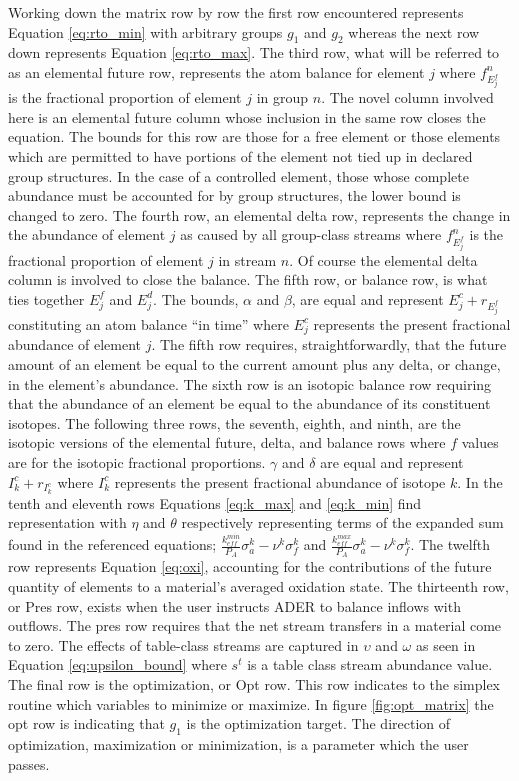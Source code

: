 Working down the matrix row by row the first row encountered represents 
Equation \ref{eq:rto_min} with arbitrary groups $g_{1}$ and $g_{2}$ whereas 
the next row 
down represents Equation \ref{eq:rto_max}. The third row, what will be referred
to as an elemental future row, represents the atom balance for element $j$ where
$f^{n}_{E_{j}^{f}}$ is the fractional proportion of element $j$ in group $n$.
The novel column involved here is an elemental future column whose inclusion
in the same row closes the equation.  
The bounds for this row are those for a
free element or those elements which are permitted to have portions
of the element not tied up in declared group structures. In the case of a
controlled element, those whose complete abundance must be accounted for by
group structures, the lower bound is changed to zero. 
The fourth row, an elemental
delta row, represents the change in the abundance of element $j$
as caused by all group-class streams where
$f^{n}_{E_{j}^{f}}$ is the fractional proportion of element $j$ in stream $n$. 
Of course the elemental delta column 
is involved to close the balance. The fifth row, or balance row, is what ties
together $E_{j}^{f}$ and $E_{j}^{d}$. The bounds, $\alpha$ and $\beta$,
are equal and represent $E_{j}^{c} + r_{E_{j}^{f}}$ constituting an atom
balance ``in time'' where $E_{j}^{c}$ represents the present fractional
abundance of element $j$. The fifth row requires, straightforwardly, that the
future amount of an element be equal to the current amount plus any delta,
or change, in the element's abundance. The sixth row is an isotopic balance row
requiring that the abundance of an element be equal to the abundance of its
constituent isotopes. 
The following three rows, the seventh, eighth, and ninth,
are the isotopic versions of the elemental future, delta, and balance rows 
where $f$ values
are for the isotopic fractional proportions.
$\gamma$ and $\delta$ are
equal and represent $I_{k}^{c} + r_{I_{k}^{c}}$ where $I_{k}^{c}$ represents
the present fractional abundance of isotope $k$. In the tenth and eleventh rows
Equations \ref{eq:k_max} and \ref{eq:k_min} find representation with $\eta$
and $\theta$ respectively representing terms of the expanded sum found in the
referenced equations; $\frac{k_{eff}^{min}}{P_{A}} \sigma_{a}^{k} - \nu^{k}
\sigma_{f}^{k}$ and
$\frac{k_{eff}^{max}}{P_{A}} \sigma_{a}^{k} - \nu^{k}
\sigma_{f}^{k}$. 
The twelfth row represents Equation \ref{eq:oxi}, accounting for the
contributions of the future quantity of elements to a material's averaged
oxidation state.
The thirteenth row, or Pres row, exists
when the user instructs ADER to balance inflows with outflows. The
pres row requires that the net stream transfers in a material come to zero. The
effects of table-class streams are captured in $\upsilon$ and $\omega$ as seen
in Equation \ref{eq:upsilon_bound} where $s^{t}$ is a table class stream 
abundance value. The final row is the optimization, or Opt row. This row
indicates to the simplex routine which variables to minimize or maximize. In
figure \ref{fig:opt_matrix} the opt row is indicating that $g_{1}$ is the
optimization target. The direction of optimization, maximization or
minimization, is a parameter which the user passes.
    
